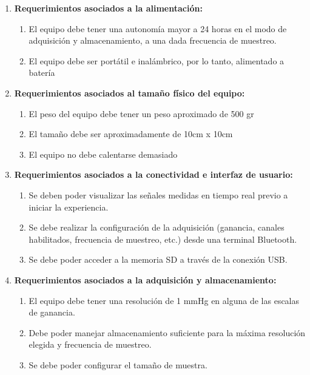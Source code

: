 \begin{enumerate}
	\item \textbf{Requerimientos asociados a la alimentación:} 
	\begin{enumerate}[label*=\arabic*.]
		\item El equipo debe tener una autonomía mayor a 24 horas en el modo de adquisición y almacenamiento, a una dada frecuencia de muestreo.
		\item El equipo debe ser portátil e inalámbrico, por lo tanto, alimentado a batería
	\end{enumerate}
	
	\item \textbf{Requerimientos asociados al tamaño físico del equipo:}
	\begin{enumerate}[label*=\arabic*.]
		\item El peso del equipo debe tener un peso aproximado de 500 gr
		\item El tamaño debe ser aproximadamente de 10cm x 10cm
		\item El equipo no debe calentarse demasiado
	\end{enumerate}
	
	\item \textbf{Requerimientos asociados a la conectividad e interfaz de usuario:}
	
	\begin{enumerate}[label*=\arabic*.]
		\item Se deben poder visualizar las señales medidas en tiempo real previo a iniciar la experiencia.
		\item Se debe realizar la configuración de la adquisición (ganancia, canales habilitados, frecuencia de muestreo, etc.) desde una terminal Bluetooth.
		\item Se debe poder acceder a la memoria SD a través de la conexión USB.
	\end{enumerate}


	\item \textbf{Requerimientos asociados a la adquisición y almacenamiento:}
	
	\begin{enumerate}[label*=\arabic*.]
		\item El equipo debe tener una resolución de 1 mmHg en alguna de las escalas de ganancia.
		\item Debe poder manejar almacenamiento suficiente para la máxima resolución elegida y frecuencia de muestreo.
		\item Se debe poder configurar el tamaño de muestra.
	\end{enumerate}

\end{enumerate}


